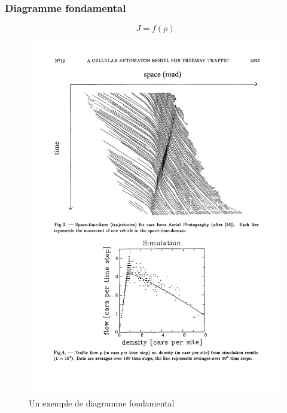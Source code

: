 \documentclass[slidetop,11pt]{beamer}
\begin{document}
\begin{frame}
	\frametitle{Diagramme fondamental}
	$$J = f(\rho)$$
	\begin{figure}
		\begin{center}	
			\includegraphics[scale = 0.6]{./images/dfondcomp}
		\end{center}
	\caption{Un exemple de diagramme fondamental}
	\end{figure}
\end{frame}
	
	
\end{document}

